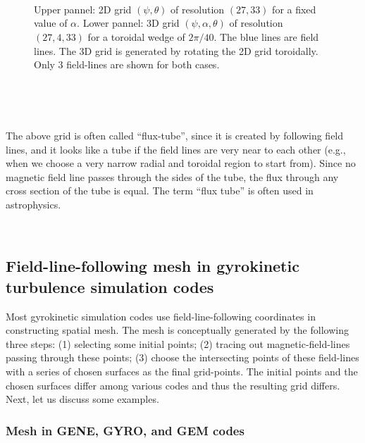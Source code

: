 \documentclass{llncs}
\begin{document}
\

\

\begin{figure}[h]
  
  \
  
  \caption{Upper pannel: 2D grid $(\psi, \theta)$ of resolution $(27, 33)$ for
  a fixed value of $\alpha$. Lower pannel: 3D grid $(\psi, \alpha, \theta)$ of
  resolution $(27, 4, 33)$ for a toroidal wedge of $2 \pi / 40$. The blue
  lines are field lines. The 3D grid is generated by rotating the 2D grid
  toroidally. Only 3 field-lines are shown for both cases.}
\end{figure}

\

\

The above grid is often called ``flux-tube'', since it is created by
following field lines, and it looks like a tube if the field lines are very
near to each other (e.g., when we choose a very narrow radial and toroidal
region to start from). Since no magnetic field line passes through the sides
of the tube, the flux through any cross section of the tube is equal. The term
``flux tube'' is often used in astrophysics.

\

\subsection{Field-line-following mesh in gyrokinetic turbulence simulation
codes}

Most gyrokinetic simulation codes use field-line-following coordinates in
constructing spatial mesh. The mesh is conceptually generated by the following
three steps: (1) selecting some initial points; (2) tracing out
magnetic-field-lines passing through these points; (3) choose the intersecting
points of these field-lines with a series of chosen surfaces as the final
grid-points. The initial points and the chosen surfaces differ among various
codes and thus the resulting grid differs. Next, let us discuss some examples.

\subsubsection{Mesh in GENE, GYRO, and GEM codes}
\end{document}
